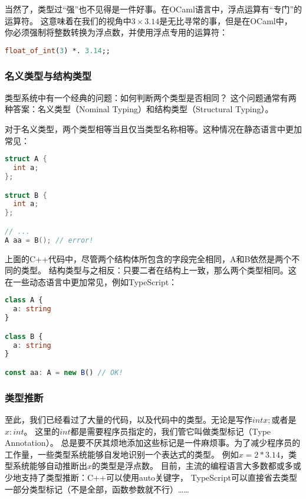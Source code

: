 \documentclass[../main.tex]{subfiles}
\begin{document}
  \indent 当然了，类型过“强”也不见得是一件好事。在OCaml语言中，浮点运算有“专门”的运算符。
  这意味着在我们的视角中$3 \times 3.14$是无比寻常的事，但是在OCaml中，
  你必须强制将整数转换为浮点数，并使用浮点专用的运算符：

\begin{lstlisting}[language=ml]
float_of_int(3) *. 3.14;;
\end{lstlisting}

  \subsubsection*{名义类型与结构类型}
  \indent 类型系统中有一个经典的问题：如何判断两个类型是否相同？
  这个问题通常有两种答案：名义类型（Nominal Typing）和结构类型（Structural Typing）。

  \indent 对于名义类型，两个类型相等当且仅当类型名称相等。这种情况在静态语言中更加常见：

\begin{lstlisting}[language=c++]
struct A {
  int a;
};

struct B {
  int a;
};

// ...
A aa = B(); // error!
\end{lstlisting}

  \indent 上面的C++代码中，尽管两个结构体所包含的字段完全相同，A和B依然是两个不同的类型。
  结构类型与之相反：只要二者在结构上一致，那么两个类型相同。这在一些动态语言中更加常见，例如TypeScript：

\begin{lstlisting}[language=TypeScript]
class A {
  a: string
}

class B {
  a: string
}

const aa: A = new B() // OK!
\end{lstlisting}

  \subsubsection*{类型推断}
  \indent 至此，我们已经看过了大量的代码，以及代码中的类型。无论是写作$int x;$或者是$x: int$。
  这里的$int$都是需要程序员指定的，我们管它叫做类型标记（Type Annotation）。
  总是要不厌其烦地添加这些标记是一件麻烦事。为了减少程序员的工作量，一些类型系统能够自发地识别一个表达式的类型。
  例如$x = 2 * 3.14$，类型系统能够自动推断出$x$的类型是浮点数。
  目前，主流的编程语言大多数都或多或少地支持了类型推断：C++可以使用auto关键字，
  TypeScript可以直接省去类型一部分类型标记（不是全部，函数参数就不行）……
\end{document}
